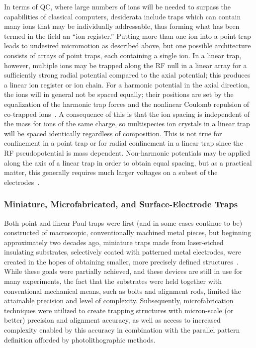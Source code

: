 \documentclass[%
reprint,
 amsmath,amssymb,
]{revtex4-1}
\begin{document}
In terms of QC, where large numbers of ions will be needed to surpass the capabilities of classical computers, desiderata include traps which can contain many ions that may be individually addressable, thus forming what has been termed in the field an ``ion register.''  Putting more than one ion into a point trap leads to undesired micromotion as described above, but one possible architecture consists of arrays of point traps, each containing a single ion.  In a linear trap, however, multiple ions may be trapped along the RF null in a linear array for a sufficiently strong radial potential compared to the axial potential; this produces a linear ion register or ion chain.  For a harmonic potential in the axial direction, the ions will in general not be spaced equally; their positions are set by the equalization of the harmonic trap forces and the nonlinear Coulomb repulsion of co-trapped ions~\cite{James1998}.  A consequence of this is that the ion spacing is independent of the mass for ions of the same charge, so multispecies ion crystals in a linear trap will be spaced identically regardless of composition.  This is not true for confinement in a point trap or for radial confinement in a linear trap since the RF pseudopotential is mass dependent.  Non-harmonic potentials may be applied along the axis of a linear trap in order to obtain equal spacing, but as a practical matter, this generally requires much larger voltages on a subset of the electrodes~\cite{PaganoCryoChains2018}.

\subsubsection{Miniature, Microfabricated, and Surface-Electrode Traps}
\label{MicroTraps}

Both point and linear Paul traps were first (and in some cases continue to be) constructed of macroscopic, conventionally machined metal pieces, but beginning approximately two decades ago, miniature traps made from laser-etched insulating substrates, selectively coated with patterned metal electrodes, were created in the hopes of obtaining smaller, more precisely defined structures~\cite{NIST:ion_transport:2002}.  While these goals were partially achieved, and these devices are still in use for many experiments, the fact that the substrates were held together with conventional mechanical means, such as bolts and alignment rods, limited the attainable precision and level of complexity.  Subsequently, microfabrication techniques were utilized to create trapping structures with micron-scale (or better) precision and alignment accuracy, as well as access to increased complexity enabled by this accuracy in combination with the parallel pattern definition afforded by photolithographic methods.
\end{document}
